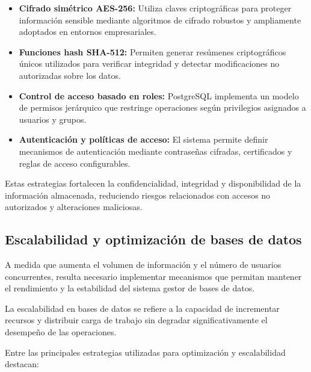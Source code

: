 \begin{itemize}

\item \textbf{Cifrado simétrico AES-256:} Utiliza claves criptográficas para proteger información sensible mediante algoritmos de cifrado robustos y ampliamente adoptados en entornos empresariales.

\item \textbf{Funciones hash SHA-512:} Permiten generar resúmenes criptográficos únicos utilizados para verificar integridad y detectar modificaciones no autorizadas sobre los datos.

\item \textbf{Control de acceso basado en roles:} PostgreSQL implementa un modelo de permisos jerárquico que restringe operaciones según privilegios asignados a usuarios y grupos.

\item \textbf{Autenticación y políticas de acceso:} El sistema permite definir mecanismos de autenticación mediante contraseñas cifradas, certificados y reglas de acceso configurables.
\end{itemize}

Estas estrategias fortalecen la confidencialidad, integridad y disponibilidad de la información almacenada, reduciendo riesgos relacionados con accesos no autorizados y alteraciones maliciosas.

\subsection{Escalabilidad y optimización de bases de datos}

A medida que aumenta el volumen de información y el número de usuarios concurrentes, resulta necesario implementar mecanismos que permitan mantener el rendimiento y la estabilidad del sistema gestor de bases de datos.

La escalabilidad en bases de datos se refiere a la capacidad de incrementar recursos y distribuir carga de trabajo sin degradar significativamente el desempeño de las operaciones.

Entre las principales estrategias utilizadas para optimización y escalabilidad destacan:

